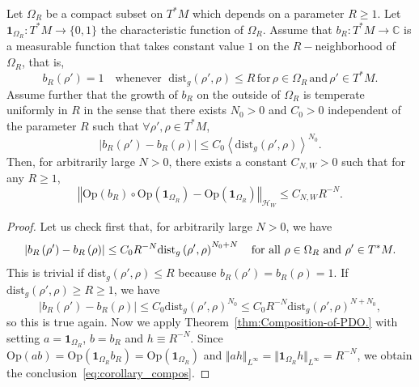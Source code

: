 \documentclass[10pt]{amsart}
\theoremstyle{definition}\newtheorem{defi}[theo]{Definition}\newtheorem{rema}[theo]{Remark}\newtheorem{exam}[theo]{Example}\newtheorem{exem}[theo]{Example}\newtheorem{nota}[theo]{Notation}
\newcommand{\clH}{\mathcal{H}}
\newcommand{\dist}{\mathrm{dist}}
\newcommand{\Opp}{\mathrm{Op}}
\newcommand{\bbC}{\mathbb{C}}
\let\oldforall\forall
\renewcommand*{\forall}{\mathrel{\oldforall}}
\begin{document}
\begin{cBoxB}{}
\begin{coro}\label{cor:B3}
Let $\Omega_{R}$ be a compact subset on $T^{*}M$ which depends on a parameter $R\ge1$. Let $\boldsymbol{1}_{\Omega_{R}}:T^{*}M\rightarrow\{ 0,1\} $ the characteristic function of $\Omega_{R}$. Assume that $b_{R}:T^{*}M\rightarrow\bbC$ is a measurable function that takes constant value $1$ on the $R-$neighborhood of $\Omega_{R}$, that is,
\[
b_{R}\left(\rho'\right)=1\quad\text{whenever }\; \dist_{g}\left(\rho',\rho\right)\leq R \,\text{for}\, \ensuremath{\rho\in\Omega_{R}} \,\text{and}\, \ensuremath{\rho'\in T^{*}M}.
\]
Assume further that the growth of $b_{R}$ on the outside of $\Omega_{R}$ is temperate uniformly in $R$ in the sense that there exists $N_{0}>0$ and $C_{0}>0$ independent of the parameter $R$ such that $\forall\rho',\rho\in T^{*}M$,
\[
\left|b_{R}\left(\rho'\right)-b_{R}\left(\rho\right)\right|\leq C_{0}\left\langle \dist_{g}\left(\rho',\rho\right)\right\rangle ^{N_{0}}.
\]
Then, for arbitrarily large $N>0$, there exists a constant $C_{N,W}>0$ such that for any $R\geq1$,
\begin{equation}\label{eq:corollary_compos}
\left\Vert \Opp \left(b_{R}\right)\circ\Opp \left(\boldsymbol{1}_{\Omega_{R}}\right)-\Opp \left(\boldsymbol{1}_{\Omega_{R}}\right)\right\Vert _{\clH _{W}}\leq C_{N,W}R^{-N}.
\end{equation}
\end{coro}
\end{cBoxB}

\begin{proof}
Let us check first that, for arbitrarily large $N>0$, we have
\[
\left|b_{R}\left(\rho'\right)-b_{R}\left(\rho\right)\right|\leq C_{0}R^{-N}\dist_{g}\left(\rho',\rho\right)^{N_{0}+N}\quad\text{for all \ensuremath{\rho\in\Omega_{R}} and }\rho'\in T^{*}M.
\]
This is trivial if $\dist_{g}(\rho',\rho)\leq R$ because $b_{R}(\rho')=b_{R}(\rho)=1$. If $\dist_{g}(\rho',\rho)\geq R\geq1$, we have
\[
\left|b_{R}\left(\rho'\right)-b_{R}\left(\rho\right)\right|\leq C_{0}\dist_{g}\left(\rho',\rho\right)^{N_{0}}\leq C_{0}R^{-N}\dist_{g}\left(\rho',\rho\right)^{N+N_{0}},
\]
so this is true again. Now we apply Theorem~\ref{thm:Composition-of-PDO.} with setting $a=\boldsymbol{1}_{\Omega_{R}}$, $b=b_{R}$ and $h\equiv R^{-N}$. Since $\Opp (ab)=\Opp (\boldsymbol{1}_{\Omega_{R}}b_{R})=\Opp (\boldsymbol{1}_{\Omega_{R}})$ and $\Vert ah\Vert _{L^{\infty}}=\Vert \boldsymbol{1}_{\Omega_{R}}h\Vert _{L^{\infty}}=R^{-N}$, we obtain the conclusion~\eqref{eq:corollary_compos}.
\end{proof}
\end{document}
